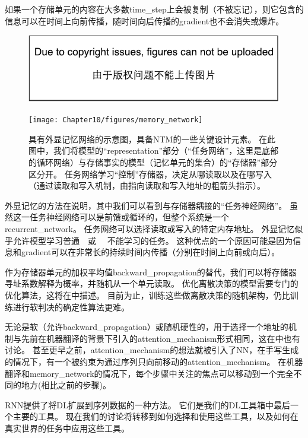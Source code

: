 如果一个存储单元的内容在大多数\gls{time_step}上会被复制（不被忘记），则它包含的信息可以在时间上向前传播，随时间向后传播的\gls{gradient}也不会消失或爆炸。

\begin{figure}[!htb]
\ifOpenSource
\centerline{\includegraphics{figure.pdf}}
\else
\centerline{\texttt{[image: Chapter10/figures/memory\_network]}}
\fi
\caption{具有外显记忆网络的示意图，具备\gls{NTM}的一些关键设计元素。
在此图中，我们将模型的``\gls{representation}''部分（``任务网络''，这里是底部的循环网络）与存储事实的模型（记忆单元的集合）的``存储器''部分区分开。
任务网络学习``控制''存储器，决定从哪读取以及在哪写入（通过读取和写入机制，由指向读取和写入地址的粗箭头指示）。
}
\label{fig:chap10_memory_network}
\end{figure}

外显记忆的方法在说明，其中我们可以看到与存储器耦接的``任务神经网络''。
虽然这一任务神经网络可以是前馈或循环的，但整个系统是一个\gls{recurrent_network}。
任务网络可以选择读取或写入的特定内存地址。
外显记忆似乎允许模型学习普通~~或~ ~不能学习的任务。
这种优点的一个原因可能是因为信息和\gls{gradient}可以在非常长的持续时间内传播（分别在时间上向前或向后）。


作为存储器单元的加权平均值\gls{backward_propagation}的替代，我们可以将存储器寻址系数解释为概率，并随机从一个单元读取\citep{Zaremba+Sutskever-arxiv2015}。
优化离散决策的模型需要专门的优化算法，这将在中描述。
目前为止，训练这些做离散决策的随机架构，仍比训练进行软判决的确定性算法更难。

无论是软（允许\gls{backward_propagation}）或随机硬性的，用于选择一个地址的机制与先前在机器翻译的背景下引入的\gls{attention_mechanism}形式相同\citep{Bahdanau-et-al-ICLR2015-small}，这在中也有讨论。
甚至更早之前，\gls{attention_mechanism}的想法就被引入了\gls{NN}，在手写生成的情况下\citep{Graves-arxiv2013}，有一个被约束为通过序列只向前移动的\gls{attention_mechanism}。
在机器翻译和\gls{memory_network}的情况下，每个步骤中关注的焦点可以移动到一个完全不同的地方(相比之前的步骤)。

\gls{RNN}提供了将\gls{DL}扩展到序列数据的一种方法。
它们是我们的\gls{DL}工具箱中最后一个主要的工具。
现在我们的讨论将转移到如何选择和使用这些工具，以及如何在真实世界的任务中应用这些工具。
